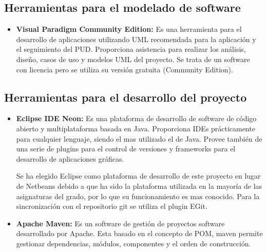 \documentclass[12pt, a4paper]{article}
\begin{document}
	
	
	

\subsection{Herramientas para el modelado de software}

\begin{itemize}
	\item \textbf{Visual Paradigm Community Edition: }
		Es una herramienta para el desarrollo de aplicaciones utilizando \gls{UML} recomendada para la aplicación y el seguimiento del \gls{PUD}. Proporciona asistencia para realizar los análisis, diseño, casos de uso y modelos \gls{UML} del proyecto. Se trata de un software con licencia pero se utiliza su versión gratuita (Community Edition).
\end{itemize}
	
\subsection{Herramientas para el desarrollo del proyecto}

\begin{itemize}
	\item \textbf{Eclipse IDE Neon: } Es una plataforma de desarrollo de software de código abierto y multiplataforma basada en Java. Proporciona \glspl{IDE} prácticamente para cualquier lenguaje, siendo el mas utilizado el de Java. Provee también de una serie de plugins para el control de versiones y frameworks para el desarrollo de aplicaciones gráficas.
	
	\vspace{2mm}
	
	Se ha elegido Eclipse como plataforma de desarrollo de este proyecto en lugar de Netbeans debido a que ha sido la plataforma utilizada en la mayoría de las asignaturas del grado, por lo que su funcionamiento es mas conocido. Para la sincronización con el repositorio git se utiliza el plugin EGit.\\
	
	\item \textbf{Apache Maven: }Es un software de gestión de proyectos software desarrollado por Apache. Esta basado en el concepto de \gls{POM}, maven permite gestionar dependencias, módulos, componentes y el orden de construcción.
	
\end{itemize}

\newpage
\end{document}
